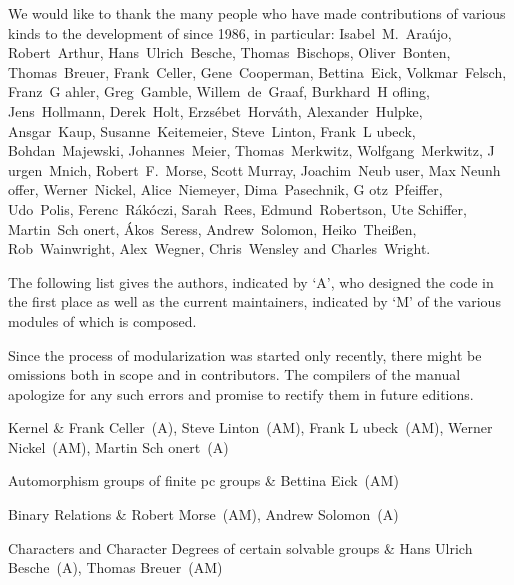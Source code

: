 

{\obeylines%
We would like to thank the many people who have made contributions of
various kinds to the development of {\GAP} since 1986, in particular:
\medskip
Isabel~M.~Ara{\'u}jo, Robert~Arthur, Hans~Ulrich~Besche, Thomas~Bischops,
Oliver~Bonten, Thomas~Breuer, Frank~Celler, Gene~Cooperman, Bettina~Eick,
Volkmar~Felsch, Franz~G{ a}hler, Greg~Gamble, Willem~de~Graaf,
Burkhard~H{ o}fling, Jens~Hollmann, Derek~Holt, Erzs{\'e}bet~Horv{\'a}th, 
Alexander~Hulpke, Ansgar~Kaup, Susanne~Keitemeier, Steve~Linton,
Frank~L{ u}beck, Bohdan~Majewski, Johannes~Meier, Thomas~Merkwitz, 
Wolfgang~Merkwitz, J{ u}rgen~Mnich, Robert~F.~Morse, Scott Murray, 
Joachim~Neub{ u}ser, Max Neunh{ o}ffer, Werner~Nickel, 
Alice~Niemeyer, Dima~Pasechnik, G{ o}tz~Pfeiffer, Udo~Polis,
Ferenc~R{\'a}k{\'o}czi, Sarah~Rees, Edmund~Robertson, Ute Schiffer, 
Martin~Sch{ o}nert, {\'A}kos~Seress, Andrew~Solomon, 
Heiko~Thei{\ss}en, Rob~Wainwright, Alex~Wegner, Chris~Wensley and Charles~Wright.
}%
\bigskip \bigskip \bigskip

The following list gives the authors, indicated by `A', who designed the code in the first
place as well as the current maintainers, indicated by `M' of the various modules of which
{\GAP} is composed.

Since the process of modularization was started only recently, there might
be omissions both in scope and in contributors.  The compilers of the
manual apologize for any such errors and promise to rectify them in future
editions.

\hfuzz=5pt%

\beginitems
Kernel & 
Frank Celler~(A), Steve Linton~(AM), Frank L{ u}beck~(AM), 
Werner Nickel~(AM), Martin Sch{ o}nert~(A)

Automorphism groups of finite pc groups &
Bettina Eick~(AM)

Binary Relations &
Robert Morse~(AM), Andrew Solomon~(A) 

Characters and Character Degrees of certain solvable groups &
Hans Ulrich Besche~(A), Thomas Breuer~(AM)

